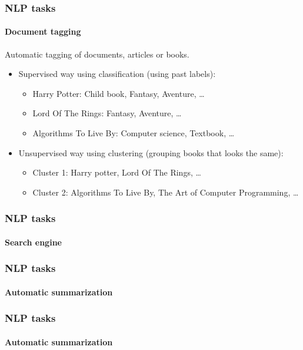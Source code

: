 \documentclass[9pt]{beamer}
\begin{document}
\begin{frame}
  \frametitle{NLP tasks}

  \framesubtitle{Document tagging}

  Automatic tagging of documents, articles or books.

  \bigskip

  \begin{itemize}
  \item Supervised way using classification (using past labels):
    \begin{itemize}
    \item Harry Potter: Child book, Fantasy, Aventure, \dots
    \item Lord Of The Rings: Fantasy, Aventure, \dots
    \item Algorithms To Live By: Computer science, Textbook, \dots
    \end{itemize}

    \bigskip

  \item Unsupervised way using clustering (grouping books that looks the same):
    \begin{itemize}
    \item Cluster 1: Harry potter, Lord Of The Rings, \dots
    \item Cluster 2: Algorithms To Live By, The Art of Computer Programming, \dots
    \end{itemize}
  \end{itemize}
\end{frame}

\begin{frame}
  \frametitle{NLP tasks}

  \framesubtitle{Search engine}
\end{frame}

\begin{frame}
  \frametitle{NLP tasks}

  \framesubtitle{Automatic summarization}
\end{frame}

\begin{frame}
  \frametitle{NLP tasks}

  \framesubtitle{Automatic summarization}
\end{frame}
\end{document}
